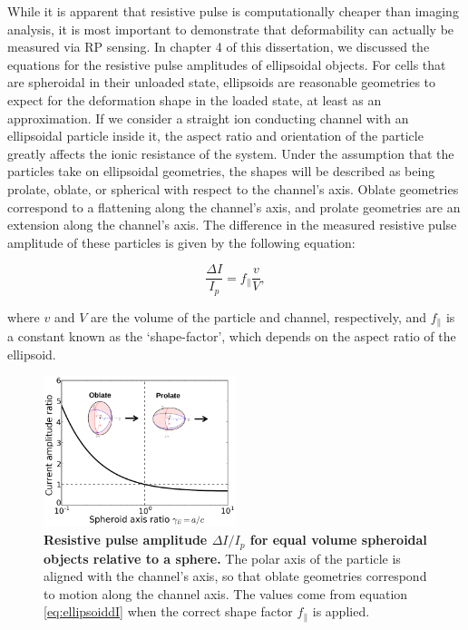 		While it is apparent that resistive pulse is computationally cheaper than imaging analysis, it is most important to demonstrate that deformability can actually be measured via RP sensing. In chapter 4 of this dissertation, we discussed the equations for the resistive pulse amplitudes of ellipsoidal objects. For cells that are spheroidal in their unloaded state, ellipsoids are reasonable geometries to expect for the deformation shape in the loaded state, at least as an approximation. If we consider a straight ion conducting channel with an ellipsoidal particle inside it, the aspect ratio and orientation of the particle greatly affects the ionic resistance of the system. Under the assumption that the particles take on ellipsoidal geometries, the shapes will be described as being prolate, oblate, or spherical with respect to the channel's axis. Oblate geometries correspond to a flattening along the channel's axis, and prolate geometries are an extension along the channel's axis. The difference in the measured resistive pulse amplitude of these particles is given by the following equation:
		
		\begin{equation} \label{eq:ellipsoiddI}
			\frac{\Delta I}{I_{p}}=f_{\parallel}\frac{v}{V},
		\end{equation}
		
		where $v$ and $V$ are the volume of the particle and channel, respectively, and $f_{\parallel}$ is a constant known as the `shape-factor', which depends on the aspect ratio of the ellipsoid. 
		
		\begin{figure}
			\includegraphics[width=0.5\textwidth]{dIellipsoid.png}
			\caption{\textbf{Resistive pulse amplitude $\Delta I/I_{p}$ for equal volume spheroidal objects relative to a sphere.} The polar axis of the particle is aligned with the channel's axis, so that oblate geometries correspond to motion along the channel axis. The values come from equation \ref{eq:ellipsoiddI} when the correct shape factor $f_{\parallel}$ is applied.}
		\end{figure}

